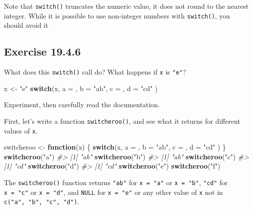 \documentclass[]{book}
\newenvironment{Shaded}{\begin{snugshade}}{\end{snugshade}}
\newcommand{\CommentTok}[1]{\textcolor[rgb]{0.56,0.35,0.01}{\textit{#1}}}
\newcommand{\ControlFlowTok}[1]{\textcolor[rgb]{0.13,0.29,0.53}{\textbf{#1}}}
\newcommand{\DataTypeTok}[1]{\textcolor[rgb]{0.13,0.29,0.53}{#1}}
\newcommand{\KeywordTok}[1]{\textcolor[rgb]{0.13,0.29,0.53}{\textbf{#1}}}
\newcommand{\NormalTok}[1]{#1}
\newcommand{\StringTok}[1]{\textcolor[rgb]{0.31,0.60,0.02}{#1}}
\theoremstyle{plain}
\theoremstyle{remark}
\begin{document}
Note that \texttt{switch()} truncates the numeric value, it does not
round to the nearest integer. While it is possible to use non-integer
numbers with \texttt{switch()}, you should avoid it

\hypertarget{exercise-19.4.6}{%
\subsection*{\texorpdfstring{Exercise
{19.4.6}}{Exercise 19.4.6}}\label{exercise-19.4.6}}

What does this \texttt{switch()} call do? What happens if \texttt{x} is
\texttt{"e"}?

\begin{Shaded}
\begin{Highlighting}[]
\NormalTok{x <-}\StringTok{ "e"}
\ControlFlowTok{switch}\NormalTok{(x,}
  \DataTypeTok{a =}\NormalTok{ ,}
  \DataTypeTok{b =} \StringTok{"ab"}\NormalTok{,}
  \DataTypeTok{c =}\NormalTok{ ,}
  \DataTypeTok{d =} \StringTok{"cd"}
\NormalTok{)}
\end{Highlighting}
\end{Shaded}

Experiment, then carefully read the documentation.

First, let's write a function \texttt{switcheroo()}, and see what it
returns for different values of \texttt{x}.

\begin{Shaded}
\begin{Highlighting}[]
\NormalTok{switcheroo <-}\StringTok{ }\ControlFlowTok{function}\NormalTok{(x) \{}
  \ControlFlowTok{switch}\NormalTok{(x,}
    \DataTypeTok{a =}\NormalTok{ ,}
    \DataTypeTok{b =} \StringTok{"ab"}\NormalTok{,}
    \DataTypeTok{c =}\NormalTok{ ,}
    \DataTypeTok{d =} \StringTok{"cd"}
\NormalTok{  )}
\NormalTok{\}}
\KeywordTok{switcheroo}\NormalTok{(}\StringTok{"a"}\NormalTok{)}
\CommentTok{#> [1] "ab"}
\KeywordTok{switcheroo}\NormalTok{(}\StringTok{"b"}\NormalTok{)}
\CommentTok{#> [1] "ab"}
\KeywordTok{switcheroo}\NormalTok{(}\StringTok{"c"}\NormalTok{)}
\CommentTok{#> [1] "cd"}
\KeywordTok{switcheroo}\NormalTok{(}\StringTok{"d"}\NormalTok{)}
\CommentTok{#> [1] "cd"}
\KeywordTok{switcheroo}\NormalTok{(}\StringTok{"e"}\NormalTok{)}
\KeywordTok{switcheroo}\NormalTok{(}\StringTok{"f"}\NormalTok{)}
\end{Highlighting}
\end{Shaded}

The \texttt{switcheroo()} function returns \texttt{"ab"} for
\texttt{x\ =\ "a"} or \texttt{x\ =\ "b"}, \texttt{"cd"} for
\texttt{x\ =\ "c"} or \texttt{x\ =\ "d"}, and \texttt{NULL} for
\texttt{x\ =\ "e"} or any other value of \texttt{x} not in
\texttt{c("a",\ "b",\ "c",\ "d")}.
\end{document}
